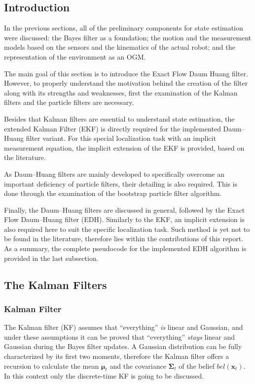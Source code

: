 \subsection{Introduction}

In the previous sections, all of the preliminary components for
state estimation were discussed:
the Bayes filter as a foundation;
the motion and the measurement models based on the
sensors and the kinematics of the actual robot;
and the representation of the environment as an OGM.

The main goal of this section is to introduce the Exact Flow Daum Huang filter. However, to properly understand the motivation behind
the creation of the filter along with its strengths and weaknesses, first the
examination of the Kalman filters and the particle filters are necessary.

Besides that Kalman filters are essential to understand state estimation,
the extended Kalman Filter (EKF) is directly required for the implemented Daum--Huang filter variant. For this special localization task with
an implicit measurement equation, the implicit extension of the EKF is provided, based on the literature.

As Daum--Huang filters are mainly developed to specifically overcome
an important deficiency of particle filters, their detailing is
also required. This is done through the examination of the bootstrap particle filter algorithm.

Finally, the Daum--Huang filters are discussed in general,
followed by the Exact Flow Daum--Huang filter (EDH). Similarly to the EKF,
an implicit extension is also required here to suit the
specific localization task. Such method is  yet not to be found in the literature, therefore lies within the contributions
of this report. As a summary, the complete pseudocode for the implemented EDH algorithm is provided in the last subsection.
\subsection{The Kalman Filters}
\subsubsection{Kalman Filter}
The Kalman filter (KF) assumes that ``everything'' \emph{is} linear and Gaussian,
and under these assumptions it can be proved that ``everything'' \emph{stays} linear and Gaussian during the Bayes filter updates.
A Gaussian distribution can be fully characterized by its first two moments,
therefore the Kalman filter offers a recursion to calculate the mean $\boldsymbol{\mu}_t$ and the covariance $\mathbf{\Sigma}_t$ of the belief $bel(\mathbf{x}_t)$.
In this context only the discrete-time KF is going to be discussed.

